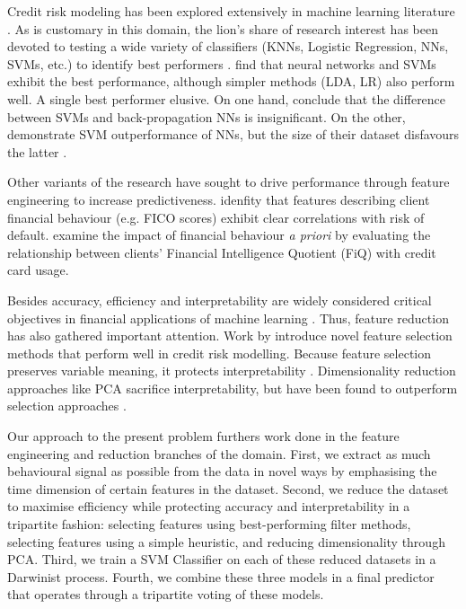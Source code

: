 \documentclass{article}
\begin{document}
Credit risk modeling has been explored extensively in machine learning literature \citep{mays1998credit}. As is customary in this domain, the lion’s share of research interest has been devoted to testing a wide variety of classifiers (KNNs, Logistic Regression, NNs, SVMs, etc.) to identify best performers \citep{yeh2009comparisons}. \citet{baesens2003benchmarking} find that neural networks and SVMs exhibit the best performance, although simpler methods (LDA, LR) also perform well. A single best performer elusive. On one hand, \citet{huang2004credit} conclude that the difference between SVMs and back-propagation NNs is insignificant. On the other, \citet{li2006evaluation} demonstrate SVM outperformance of NNs, but the size of their dataset disfavours the latter \citep{bellotti2009support}.

Other variants of the research have sought to drive performance through feature engineering to increase predictiveness. \citet{agarwal2010importance} idenfity that features describing client financial behaviour (e.g. FICO scores) exhibit clear correlations with risk of default. \citet{kamil2014examining} examine the impact of financial behaviour \textit{a priori} by evaluating the relationship between clients’ Financial Intelligence Quotient (FiQ) with credit card usage. 

Besides accuracy, efficiency and interpretability are widely considered critical objectives in financial applications of machine learning \citep{hand1997statistical}. Thus, feature reduction has also gathered important attention. Work by \citet{hu2019feature, mbuvha2019bayesian, piramuthu2004evaluating} introduce novel feature selection methods that perform well in credit risk modelling. Because feature selection preserves variable meaning, it protects interpretability \citep{masaeli2010transformation}. Dimensionality reduction approaches like PCA sacrifice interpretability, but have been found to outperform selection approaches \citep{koutanaei2015hybrid}.

Our approach to the present problem furthers work done in the feature engineering and reduction branches of the domain. First, we extract as much behavioural signal as possible from the data in novel ways by emphasising the time dimension of certain features in the dataset. Second, we reduce the dataset to maximise efficiency while protecting accuracy and interpretability in a tripartite fashion: selecting features using best-performing filter methods, selecting features using a simple heuristic, and reducing dimensionality through PCA. Third, we train a SVM Classifier on each of these reduced datasets in a Darwinist process. Fourth, we combine these three models in a final predictor that operates through a tripartite voting of these models.
\end{document}
